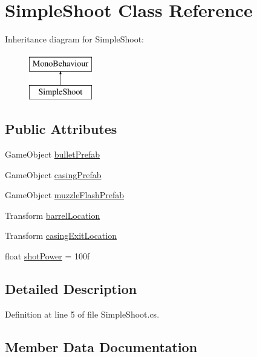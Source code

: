 \hypertarget{class_simple_shoot}{}\section{Simple\+Shoot Class Reference}
\label{class_simple_shoot}
Inheritance diagram for Simple\+Shoot\+:\begin{figure}[H]
\begin{center}
\leavevmode
\includegraphics[height=2.000000cm]{class_simple_shoot}
\end{center}
\end{figure}
\subsection*{Public Attributes}
\begin{DoxyCompactItemize}
\item 
Game\+Object \mbox{\hyperlink{class_simple_shoot_ac171d2d5c1240a628df27f5daad30650}{bullet\+Prefab}}
\item 
Game\+Object \mbox{\hyperlink{class_simple_shoot_a71ec8176d7de8605e8b3179afdd84883}{casing\+Prefab}}
\item 
Game\+Object \mbox{\hyperlink{class_simple_shoot_afd2c2e1225dc098740ccee326dbad174}{muzzle\+Flash\+Prefab}}
\item 
Transform \mbox{\hyperlink{class_simple_shoot_ae756812319827a97b75d211f7359ce4f}{barrel\+Location}}
\item 
Transform \mbox{\hyperlink{class_simple_shoot_a93e53fc58d93328650990c266e37bf45}{casing\+Exit\+Location}}
\item 
float \mbox{\hyperlink{class_simple_shoot_af962ecc5f24c7ea0d8a77c36abe0c02f}{shot\+Power}} = 100f
\end{DoxyCompactItemize}


\subsection{Detailed Description}


Definition at line 5 of file Simple\+Shoot.\+cs.



\subsection{Member Data Documentation}
\mbox{\label{class_simple_shoot_ae756812319827a97b75d211f7359ce4f}} 

